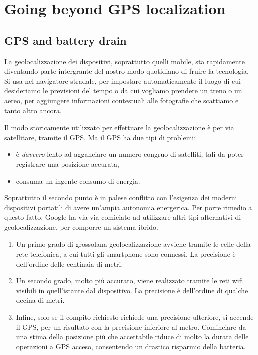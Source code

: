 
\section{Going beyond GPS localization}
\label{sec:gps}

\subsection{GPS and battery drain}
La geolocalizzazione dei dispositivi, soprattutto quelli mobile, sta rapidamente diventando parte intergrante del nostro modo quotidiano di fruire la tecnologia. Si usa nel navigatore stradale, per impostare automaticamente il luogo di cui desideriamo le previsioni del tempo o da cui vogliamo prendere un treno o un aereo, per aggiungere informazioni contestuali alle fotografie che scattiamo e tanto altro ancora.

Il modo storicamente utilizzato per effettuare la geolocalizzazione è per via satellitare, tramite il GPS. Ma il GPS ha due tipi di problemi:

\begin{itemize}
 \item è \emph{davvero} lento ad agganciare un numero congruo di satelliti, tali da poter registrare una posizione accurata,
 \item consuma un ingente consumo di energia. 
\end{itemize}

Soprattutto il secondo punto è in palese conflitto con l'esigenza dei moderni dispositivi portatili di avere un'ampia autonomia energerica. Per porre rimedio a questo fatto, Google ha via via comiciato ad utilizzare altri tipi alternativi di geolocalizzazione, per comporre un sistema ibrido.

\begin{enumerate}
 \item Un primo grado di grossolana geolocalizzazione avviene tramite le celle della rete telefonica, a cui tutti gli smartphone sono connessi. La precisione è dell'ordine delle centinaia di metri.
 \item Un secondo grado, molto più accurato, viene realizzato tramite le reti wifi visibili in quell'istante dal dispositivo. La precisione è dell'ordine di qualche decina di metri.
 \item Infine, solo se il compito richiesto richiede una precisione ulteriore, si accende il GPS, per un risultato con la precisione inferiore al metro. Cominciare da una stima della posizione più che accettabile riduce di molto la durata delle operazioni a GPS acceso, consentendo un drastico risparmio della batteria.
\end{enumerate}

